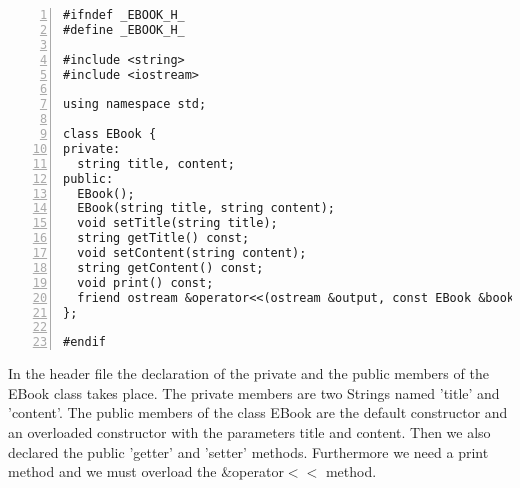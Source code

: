 \documentclass{article}
\begin{document}
\begin{lstlisting}[basicstyle=\footnotesize\ttfamily, numbers=left, stepnumber=1, numberstyle = \normalsize]
#ifndef _EBOOK_H_
#define _EBOOK_H_

#include <string>
#include <iostream>

using namespace std;

class EBook {
private:
  string title, content;
public:
  EBook();
  EBook(string title, string content);
  void setTitle(string title);
  string getTitle() const;
  void setContent(string content);
  string getContent() const;
  void print() const;
  friend ostream &operator<<(ostream &output, const EBook &book);
};

#endif

\end{lstlisting}
\normalsize{In the header file the declaration of the private and the public members of the EBook class takes place.\newline
  The private members are two Strings named 'title' and 'content'.
  The public members of the class EBook are the default constructor and an overloaded constructor with the parameters title and content.\newline
Then we also declared the public 'getter' and 'setter' methods. Furthermore we need a print method and we must overload the \&operator$<<$ method.}\newline

\newpage
\end{document}
